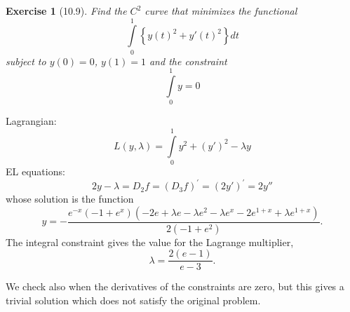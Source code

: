 \documentclass[letterpaper,twoside,11pt]{article}
\theoremstyle{mystyle}
\newtheorem*{exercise}{Exercise}
\newcommand{\cbk}{\color{black}}
\newcommand{\cblu}{\color{blue}}
\begin{document}
\cbk 





\begin{exercise}[10.9]
  Find the $C^2$ curve that minimizes the functional 
  \[\int\limits_0^1 \left\{ y(t)^2 + y'(t)^2 \right\}dt \]
  subject to $y(0) = 0$, $y(1) = 1$ and the constraint 
  \[\int\limits_0^1 y = 0\]
\end{exercise}

\cblu 
Lagrangian: 
\[L\left( {y,\lambda } \right) = \int\limits_0^1 {{y^2} + {{\left( {y'} \right)}^2} - \lambda y} \]
EL equations: 
\[2y - \lambda  = {D_2}f = {\left( {{D_3}f} \right)^\prime } = {\left( {2y'} \right)^\prime } = 2y''\]
whose solution is the function 
\[y =  - \frac{{{{{e}}^{ - x}}\left( { - 1 + {{{e}}^x}} \right)\left( { - 2{{e}} + \lambda {{e}} - \lambda {{{e}}^2} - \lambda {{{e}}^x} - 2{{{e}}^{1 + x}} + \lambda {{{e}}^{1 + x}}} \right)}}{{2\left( { - 1 + {{{e}}^2}} \right)}}.\]
The integral constraint gives the value for the Lagrange multiplier, 
\[\lambda = \frac{2(e-1)}{e-3}.\]

We check also when the derivatives of the constraints are zero, but this gives a trivial solution which does not satisfy the original problem. 

\cbk 
\end{document}
